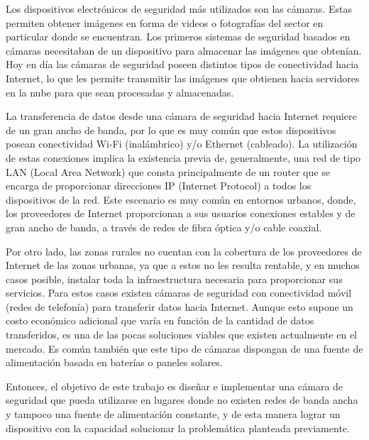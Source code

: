 \documentclass[
11pt, %
]{plan}
\begin{document}
Los dispositivos electrónicos de seguridad más utilizados son las cámaras. Estas permiten obtener imágenes en forma de videos o fotografías del sector en particular donde se encuentran. Los primeros sistemas de seguridad basados en cámaras necesitaban de un dispositivo para almacenar las imágenes que obtenían. Hoy en día las cámaras de seguridad poseen distintos tipos de conectividad hacia Internet, lo que les permite transmitir las imágenes que obtienen hacia servidores en la nube para que sean procesadas y almacenadas.

La transferencia de datos desde una cámara de seguridad hacia Internet requiere de un gran ancho de banda, por lo que es muy común que estos dispositivos posean conectividad Wi-Fi (inalámbrico) y/o Ethernet (cableado). La utilización de estas conexiones implica la existencia previa de, generalmente, una red de tipo LAN (Local Area Network) que consta principalmente de un router que se encarga de proporcionar direcciones IP (Internet Protocol) a todos los dispositivos de la red. Este escenario es muy común en entornos urbanos, donde, los proveedores de Internet proporcionan a sus usuarios conexiones estables y de gran ancho de banda, a través de redes de fibra óptica y/o cable coaxial.

Por otro lado, las zonas rurales no cuentan con la cobertura de los proveedores de Internet de las zonas urbanas, ya que a estos no les resulta rentable, y en muchos casos posible, instalar toda la infraestructura necesaria para proporcionar sus servicios. Para estos casos existen cámaras de seguridad con conectividad móvil (redes de telefonía) para transferir datos hacia Internet. Aunque esto supone un costo económico adicional que varía en función de la cantidad de datos transferidos, es una de las pocas soluciones viables que existen actualmente en el mercado. Es común también que este tipo de cámaras dispongan de una fuente de alimentación basada en baterías o paneles solares.

Entonces, el objetivo de este trabajo es diseñar e implementar una cámara de seguridad que pueda utilizarse en lugares donde no existen redes de banda ancha y tampoco una fuente de alimentación constante, y de esta manera lograr un dispositivo con la capacidad solucionar la problemática planteada previamente.
\end{document}
